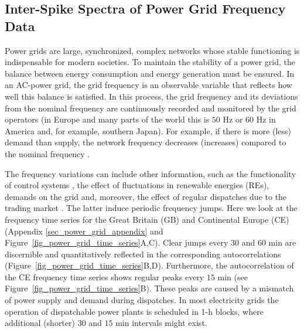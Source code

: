 \documentclass[entropy,article,accept,pdftex,moreauthors]{Definitions/mdpi}
\begin{document}
\subsection{Inter-Spike Spectra of Power Grid Frequency Data}\label{sec_power_grid}

Power grids are large, synchronized, complex networks whose stable functioning is indispensable for modern societies.
To maintain the stability of a power grid, the balance between energy consumption and energy generation must be ensured. 
In an AC-power grid, the grid frequency is an observable variable that reflects how well this balance is satisfied. 
In this process, the grid frequency and its deviations from the nominal frequency are continuously recorded and monitored by 
the grid operators (in Europe and many parts of the world this is $50$ \si{Hz} or $60$ \si{Hz} in America and, for example, southern Japan).
For example, if there is more (less) demand than supply, the network frequency decreases (increases) compared to the nominal frequency \cite{kundur1994power}.

The frequency variations can include other information, such as the functionality of control systems \cite{gorjao2020data}, the effect of fluctuations in
renewable energies (REs), demands on the grid \cite{anvari2020stochastic} and, moreover, the effect of regular dispatches due to the trading market 
\cite{meyer2020identifying}. The latter induce periodic frequency jumps. Here we look at the frequency time series for the Great Britain (GB) and Continental Europe 
(CE) (Appendix \ref{sec_power_grid_appendix} and Figure~\ref{fig_power_grid_time_series}A,C). Clear jumps every 30 and 60 min are discernible and quantitatively reflected in the corresponding 
autocorrelations (Figure~\ref{fig_power_grid_time_series}B,D). Furthermore, the autocorrelation of the CE frequency time series shows regular peaks every $15$ \si{min} 
(see Figure~\ref{fig_power_grid_time_series}B). These peaks are caused by a mismatch of power supply and demand \cite{weissbach2009high} during dispatches. 
In most electricity grids the operation of dispatchable power plants is scheduled in 1-h blocks, where additional (shorter) $30$ and $15$ \si{min} intervals
might exist.
\end{document}
